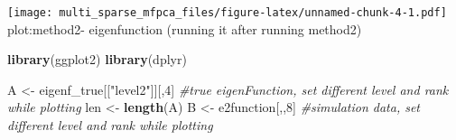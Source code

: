 \documentclass[
]{article}
\newenvironment{Shaded}{\begin{snugshade}}{\end{snugshade}}
\newcommand{\CommentTok}[1]{\textcolor[rgb]{0.56,0.35,0.01}{\textit{#1}}}
\newcommand{\DecValTok}[1]{\textcolor[rgb]{0.00,0.00,0.81}{#1}}
\newcommand{\FunctionTok}[1]{\textcolor[rgb]{0.13,0.29,0.53}{\textbf{#1}}}
\newcommand{\NormalTok}[1]{#1}
\newcommand{\OtherTok}[1]{\textcolor[rgb]{0.56,0.35,0.01}{#1}}
\newcommand{\StringTok}[1]{\textcolor[rgb]{0.31,0.60,0.02}{#1}}
\begin{document}
\texttt{[image: multi\_sparse\_mfpca\_files/figure-latex/unnamed-chunk-4-1.pdf]}
plot:method2- eigenfunction (running it after running method2)

\begin{Shaded}
\begin{Highlighting}[]
\FunctionTok{library}\NormalTok{(ggplot2)  }
\FunctionTok{library}\NormalTok{(dplyr)  }

\NormalTok{A }\OtherTok{\textless{}{-}}\NormalTok{ eigenf\_true[[}\StringTok{"level2"}\NormalTok{]][,}\DecValTok{4}\NormalTok{] }\CommentTok{\#true eigenFunction, set different level and rank while plotting}
\NormalTok{len }\OtherTok{\textless{}{-}} \FunctionTok{length}\NormalTok{(A)}
\NormalTok{B }\OtherTok{\textless{}{-}}\NormalTok{ e2function[,,}\DecValTok{8}\NormalTok{] }\CommentTok{\#simulation data, set different level and rank while plotting}


\end{Highlighting}
\end{Shaded}
\end{document}
